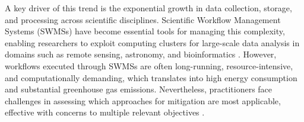 
A key driver of this trend is the exponential growth in data collection, storage, and processing across scientific disciplines. Scientific Workflow Management Systems (SWMSs) have become essential tools for managing this complexity, enabling researchers to exploit computing clusters for large-scale data analysis in domains such as remote sensing, astronomy, and bioinformatics \cite{Coleman_2021}. However, workflows executed through SWMSs are often long-running, resource-intensive, and computationally demanding, which translates into high energy consumption and substantial greenhouse gas emissions. Nevertheless, practitioners face challenges in assessing which approaches for mitigation are most applicable, effective with concerns to multiple relevant objectives \cite{thamsen2025energyawareworkflowexecutionoverview}.

